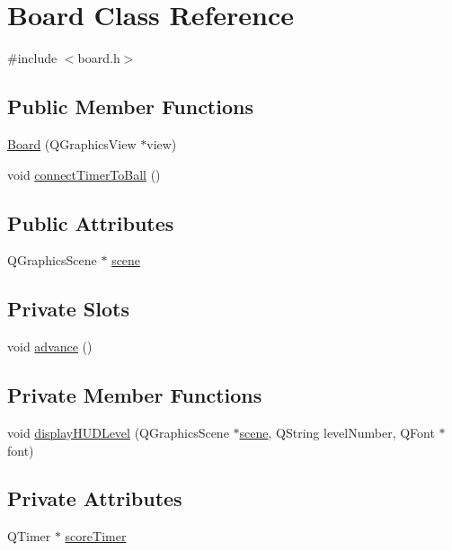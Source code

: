 \hypertarget{class_board}{
\section{Board Class Reference}
\label{class_board}
}


{\ttfamily \#include $<$board.h$>$}\subsection*{Public Member Functions}
\begin{DoxyCompactItemize}
\item 
\hyperlink{class_board_a50940feb3a6bf930f03f15cc6347b333}{Board} (QGraphicsView $\ast$view)
\item 
void \hyperlink{class_board_acadca09d3bbda3b396b788ec43838dc9}{connectTimerToBall} ()
\end{DoxyCompactItemize}
\subsection*{Public Attributes}
\begin{DoxyCompactItemize}
\item 
QGraphicsScene $\ast$ \hyperlink{class_board_a4e915266f037507fed868719ba3a8ecf}{scene}
\end{DoxyCompactItemize}
\subsection*{Private Slots}
\begin{DoxyCompactItemize}
\item 
void \hyperlink{class_board_ac8cfdf1b82b292e2ed461b49356a4c94}{advance} ()
\end{DoxyCompactItemize}
\subsection*{Private Member Functions}
\begin{DoxyCompactItemize}
\item 
void \hyperlink{class_board_a2286843a8e0eba6fba44d81f4e82b635}{displayHUDLevel} (QGraphicsScene $\ast$\hyperlink{class_board_a4e915266f037507fed868719ba3a8ecf}{scene}, QString levelNumber, QFont $\ast$font)
\end{DoxyCompactItemize}
\subsection*{Private Attributes}
\begin{DoxyCompactItemize}
\item 
QTimer $\ast$ \hyperlink{class_board_a99a70247c4e08e4bff96cd3cd10c135b}{scoreTimer}
\end{DoxyCompactItemize}



